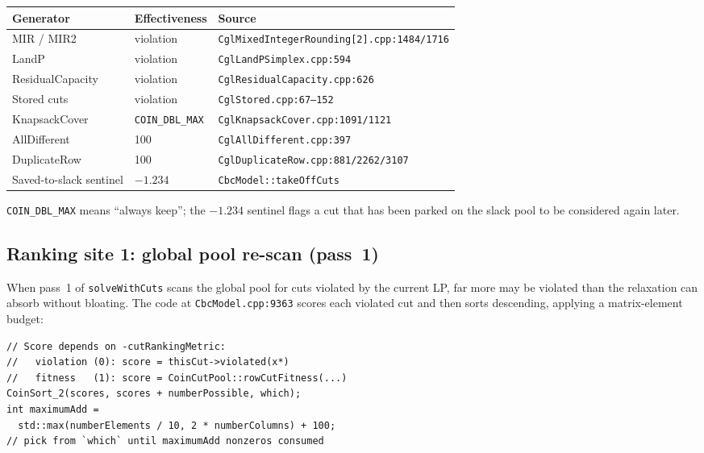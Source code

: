 \documentclass[11pt,a4paper]{article}
\begin{document}
\begin{longtable}{lll}
\toprule
\textbf{Generator}        & \textbf{Effectiveness}     & \textbf{Source}\\
\midrule
\endhead
MIR / MIR2                & violation                  & \texttt{CglMixedIntegerRounding[2].cpp:1484/1716}\\
LandP                     & violation                  & \texttt{CglLandPSimplex.cpp:594}\\
ResidualCapacity          & violation                  & \texttt{CglResidualCapacity.cpp:626}\\
Stored cuts               & violation                  & \texttt{CglStored.cpp:67--152}\\
KnapsackCover             & \texttt{COIN\_DBL\_MAX}    & \texttt{CglKnapsackCover.cpp:1091/1121}\\
AllDifferent              & 100                        & \texttt{CglAllDifferent.cpp:397}\\
DuplicateRow              & 100                        & \texttt{CglDuplicateRow.cpp:881/2262/3107}\\
Saved-to-slack sentinel   & $-1.234$                   & \texttt{CbcModel::takeOffCuts}\\
\bottomrule
\end{longtable}

\texttt{COIN\_DBL\_MAX} means ``always keep''; the $-1.234$ sentinel
flags a cut that has been parked on the slack pool to be considered
again later.

\subsection*{Ranking site 1: global pool re-scan (pass~1)}

When pass~1 of \texttt{solveWithCuts} scans the global pool for cuts
violated by the current LP, far more may be violated than the
relaxation can absorb without bloating.  The code at
\texttt{CbcModel.cpp:9363} scores each violated cut and then sorts
descending, applying a matrix-element budget:

\begin{lstlisting}
// Score depends on -cutRankingMetric:
//   violation (0): score = thisCut->violated(x*)
//   fitness   (1): score = CoinCutPool::rowCutFitness(...)
CoinSort_2(scores, scores + numberPossible, which);
int maximumAdd =
  std::max(numberElements / 10, 2 * numberColumns) + 100;
// pick from `which` until maximumAdd nonzeros consumed
\end{lstlisting}
\end{document}
